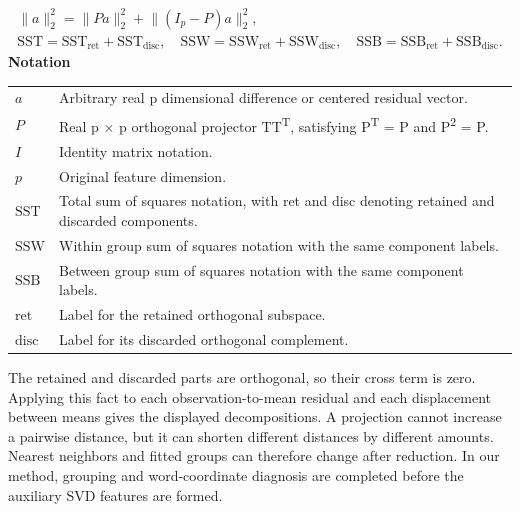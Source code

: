 \documentclass[10pt,letterpaper]{article}
\newcommand{\notlabel}{\noindent\textbf{Notation}\par\nobreak\vspace{4pt}}
\begin{document}
\par\noindent\begin{minipage}{\linewidth}
\begin{equation}\label{eq:projection}
\begin{gathered}\lVert a\rVert_2^2=\lVert Pa\rVert_2^2+\lVert(I_p-P)a\rVert_2^2,\\\mathrm{SST}=\mathrm{SST}_{\mathrm{ret}}+\mathrm{SST}_{\mathrm{disc}},\quad\mathrm{SSW}=\mathrm{SSW}_{\mathrm{ret}}+\mathrm{SSW}_{\mathrm{disc}},\quad\mathrm{SSB}=\mathrm{SSB}_{\mathrm{ret}}+\mathrm{SSB}_{\mathrm{disc}}.\end{gathered}
\end{equation}
\notlabel
{\fontsize{8.5}{10.5}\selectfont\setlength{\tabcolsep}{0pt}\renewcommand{\arraystretch}{1.12}
\begin{tabularx}{\linewidth}{@{}p{.14\linewidth}X@{}}
$a$ & Arbitrary real p dimensional difference or centered residual vector.\\
$P$ & Real p \ensuremath{\times} p orthogonal projector TT\textsuperscript{T}, satisfying P\textsuperscript{T} = P and P\textsuperscript{2} = P.\\
$I$ & Identity matrix notation.\\
$p$ & Original feature dimension.\\
$\mathrm{SST}$ & Total sum of squares notation, with ret and disc denoting retained and discarded components.\\
$\mathrm{SSW}$ & Within group sum of squares notation with the same component labels.\\
$\mathrm{SSB}$ & Between group sum of squares notation with the same component labels.\\
$\mathrm{ret}$ & Label for the retained orthogonal subspace.\\
$\mathrm{disc}$ & Label for its discarded orthogonal complement.\\
\end{tabularx}}
\par\vspace{2pt}
\end{minipage}\par
The retained and discarded parts are orthogonal, so their cross term is zero. Applying this fact to each observation-to-mean residual and each displacement between means gives the displayed decompositions. A projection cannot increase a pairwise distance, but it can shorten different distances by different amounts. Nearest neighbors and fitted groups can therefore change after reduction. In our method, grouping and word-coordinate diagnosis are completed before the auxiliary SVD features are formed.\par
\end{document}

